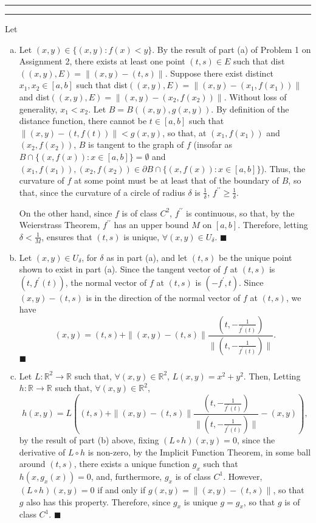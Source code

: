 \documentclass[11pt]{article}
\newcounter{questionCounter}
\newcounter{partCounter}[questionCounter]
\newenvironment{question}[2][\arabic{questionCounter}]{%
    \setcounter{partCounter}{0}%
    \vspace{.25in} \hrule \vspace{0.5em}%
        \noindent{\bf #2}%
    \vspace{0.8em} \hrule \vspace{.10in}%
    \addtocounter{questionCounter}{1}%
}{}
\begin{document}
\begin{question}{Problem 3} Let
\begin{enumerate}[(a)]
\item Let $(x,y) \in \{(x,y) : f(x) < y\}$. By the result of part (a) of
Problem 1 on Assignment 2, there exists at least one point
$(t,s) \in E$ such that dist$((x,y), E) = \|(x,y) - (t,s)\|$. Suppose there
exist distinct $x_1,x_2 \in [a,b]$ such that 
dist$((x,y), E) = \|(x,y) - (x_1,f(x_1))\|$ and
dist$((x,y), E) = \|(x,y) - (x_2,f(x_2))\|$.
Without loss of generality, $x_1 < x_2$.
Let $B = B((x,y),g(x,y))$. By definition of the distance function, there
cannot be $t \in [a,b]$ such that $\|(x,y) - (t,f(t))\| < g(x,y)$, so that, at
$(x_1,f(x_1))$ and $(x_2,f(x_2))$, $B$ is tangent to the graph of $f$ (insofar
as $B \cap \{(x,f(x)) : x \in [a,b]\} = \emptyset$ and
$(x_1,f(x_1)), (x_2,f(x_2)) \in \partial B \cap \{(x,f(x)) : x \in [a,b]\}$).
Thus, the curvature of $f$ at some point must be at least that of the boundary
of $B$, so that, since the curvature of a circle of radius $\delta$ is
$\frac{1}{\delta}$, $f^{\prime\prime} \geq \frac{1}{\delta}$.

On the other hand, since $f$ is of class $C^2$, $f^{\prime\prime}$ is
continuous, so that, by the Weierstrass Theorem, $f^{\prime\prime}$ has an
upper bound $M$ on $[a,b]$. Therefore, letting $\delta < \frac{1}{M}$, ensures
that $(t,s)$ is unique, $\forall (x,y) \in U_{\delta}$. \qquad $\blacksquare$

\item Let $(x,y) \in U_\delta$, for $\delta$ as in part (a), and let $(t,s)$
be the unique point shown to exist in part (a). Since the tangent vector of
$f$ at $(t,s)$ is $(t,f^{\prime}(t))$, the normal vector of $f$ at $(t,s)$ is
$(-f^{\prime},t)$. Since $(x,y) - (t,s)$ is in the direction of the normal
vector of $f$ at $(t,s)$, we have
\[(x,y) = (t,s) + \|(x,y) - (t,s)\|\frac{(t,-\frac{1}{f^{\prime}(t)})}{\|(t,-\frac{1}{f^{\prime}(t)})\|}.\]
\qquad $\blacksquare$

\item Let $L: \mathbb{R}^2 \rightarrow \mathbb{R}$ such that,
$\forall (x,y) \in \mathbb{R}^2$, $L(x,y) = x^2 + y^2$. Then,
Letting $h: \mathbb{R} \rightarrow \mathbb{R}$ such that,
$\forall (x,y) \in \mathbb{R}^2$,
\[h(x,y) = 
L((t,s) + \|(x,y) - (t,s)\|\frac{(t,-\frac{1}{f^{\prime}(t)})}{\|(t,-\frac{1}{f^{\prime}(t)})\|} - (x,y)),\]
by the result of part (b) above, fixing $(L \circ h)(x,y) = 0$, since the
derivative of $L \circ h$ is non-zero, by the Implicit Function Theorem, in
some ball around $(t,s)$, there exists a unique function $g_x$ such that
$h(x,g_x(x)) = 0$, and, furthermore, $g_x$ is of class $C^1$. However,
$(L \circ h)(x,y) = 0$ if and only if $g(x,y) = \|(x,y) - (t,s)\|$, so that
$g$ also has this property. Therefore, since $g_x$ is unique $g = g_x$, so
that $g$ is of class $C^1$. \qquad $\blacksquare$
\end{enumerate}
\end{question}
\end{document}
